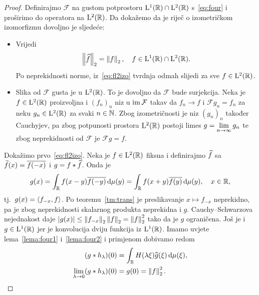 \documentclass[main.tex]{subfiles}
\begin{document}
\begin{proof}
	Definirajmo \( \mathcal F \) na gustom potprostoru \( \mathrm{L}^1(\mathbb{R}) \cap \mathrm{L}^2(\mathbb{R}) \) s~\eqref{eq:four}
	i proširimo do operatora na \( \mathrm{L}^2(\mathbb{R}) \). Da dokažemo da je riječ o izometričkom izomorfizmu
	dovoljno je sljedeće:
	\begin{itemize}
		\item Vrijedi
		      \begin{equation}\label{eq:fl2izo}
			      \left\lVert\widehat{f}\right\rVert_2 = \left\lVert f\right\rVert_2, \quad f\in \mathrm{L}^1(\mathbb{R}) \cap \mathrm{L}^2(\mathbb{R}).
		      \end{equation}
		      Po neprekidnosti norme, iz~\eqref{eq:fl2izo} tvrdnja
		      odmah slijedi za sve \( f \in \mathrm{L}^2(\mathbb{R}) \). %

		\item Slika od \( \mathcal F \) gusta je u \( \mathrm{L}^2(\mathbb{R}) \).
		      To je dovoljno da \( \mathcal F \) bude surjekcija. Neka je
		      \( f \in \mathrm{L}^2(\mathbb{R}) \) proizvoljna i \( (f_n)_n \) niz u \( \operatorname{im} \mathcal F \)
		      takav da \( f_n \rightarrow f \) i \( \mathcal F g_n = f_n \)
		      za neku \( g_n \in \mathrm{L}^2(\mathbb{R}) \) za svaki \( n \in \mathbb{N} \).
		      Zbog izometričnosti je niz \( (g_n)_n \) također Cauchyjev,
		      pa zbog potpunosti prostora \( \mathrm{L}^2(\mathbb{R}) \) postoji limes
		      \( g = \lim\limits_{n \rightarrow \infty} g_n \) te zbog neprekidnosti
		      od \( \mathcal F \) je \( \mathcal Fg = f \). %
	\end{itemize}

	Dokažimo prvo~\eqref{eq:fl2izo}.
	Neka je \( f\in\mathrm{L}^2(\mathbb{R}) \) fiksna i definirajmo \( \widetilde{f} \) sa \( \widetilde{f}(x) = \overline{f(-x)} \) i
	\( g = f * \widetilde{f} \). Onda je
	\begin{equation}
		g(x) = \int_{\mathbb{R}} f(x-y)\overline{f(-y)} \,\mathrm d \mu(y)
		= \int_{\mathbb{R}} f(x+y)\overline{f(y)} \,\mathrm d \mu(y), \quad x \in \mathbb{R},
	\end{equation}
	tj.\ \( g(x) = \left\langle {f_{-x}}, {f} \right\rangle \).
	Po teoremu~\ref{tm:trans} je preslikavanje
	\( x \mapsto f_{-x} \) neprekidno, pa je zbog neprekidnosti skalarnog produkta
	neprekidna i \( g \). Cauchy--Schwarzova nejednakost daje
	\( \left| {g(x)} \right| \le \left\lVert f_{-x}\right\rVert_2 \left\lVert f\right\rVert_2 = \left\lVert f\right\rVert_2^2 \) tako
	da je \( g \) ograničena. Još je i \( g \in \mathrm{L}^1(\mathbb{R}) \) jer je konvolucija
	dviju funkcija iz \( \mathrm{L}^1(\mathbb{R}) \).
	Imamo uvjete lema~\ref{lema:four1} i~\ref{lema:four2} i
	primjenom dobivamo redom
	\begin{align}
		(g * h_\lambda)(0)                                   & = \int_{\mathbb{R}} H(\lambda\xi)\widehat{g}(\xi) \,\mathrm d \mu(\xi) \label{eq:dokplanche-1}, \\
		\lim\limits_{\lambda \rightarrow 0} (g*h_\lambda)(0) & = g(0) = \left\lVert f\right\rVert_2^2. \label{eq:dokplanche-2}
	\end{align}


\end{proof}
\end{document}
